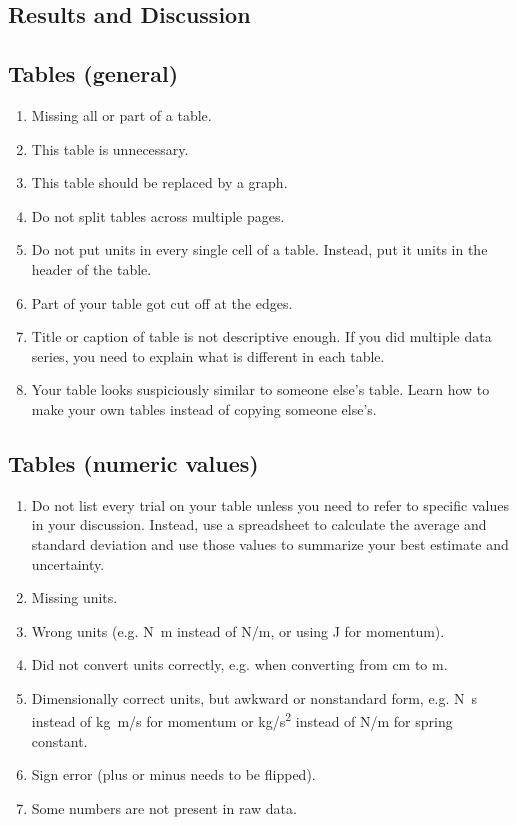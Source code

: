 \documentclass[12pt,letterpaper]{article}
\begin{document}
\begin{multicols}{2}
\section{Results and Discussion}

\subsection*{Tables (general)}

\begin{enumerate}[start=50]
  \item Missing all or part of a table.
  \item This table is unnecessary.
  \item This table should be replaced by a graph.
  \item Do not split tables across multiple pages.
  \item Do not put units in every single cell of a table.
    Instead, put it units in the header of the table.
  \item Part of your table got cut off at the edges.
  \item Title or caption of table is not descriptive enough.
    If you did multiple data series,
    you need to explain what is different in each table.
  \item Your table looks suspiciously similar to someone else's table.
    Learn how to make your own tables instead of copying someone else's.
\end{enumerate}

\subsection*{Tables (numeric values)}

\begin{enumerate}[start=60]
  \item Do not list every trial on your table
    unless you need to refer to specific values in your discussion.
    Instead, use a spreadsheet to calculate the average and standard deviation
    and use those values to summarize your best estimate and uncertainty.
  \item Missing units.
  \item Wrong units (e.g. \si{N.m} instead of \si{N/m}, or using \si{J} for momentum).
  \item Did not convert units correctly,
    e.g. when converting from \si{cm} to \si{m}.
  \item Dimensionally correct units, but awkward or nonstandard form,
    e.g. \si{N.s} instead of \si{kg.m/s} for momentum
    or \si{kg/s^2} instead of \si{N/m} for spring constant.
  \item Sign error (plus or minus needs to be flipped).
  \item Some numbers are not present in raw data.
\end{enumerate}


\end{multicols}
\end{document}
